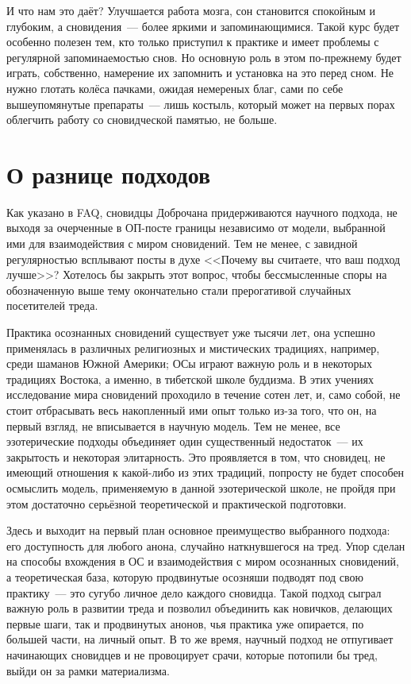 \documentclass[a5paper,12pt,twoside]{memoir}
\begin{document}
И что нам это даёт? Улучшается работа мозга, сон становится спокойным и глубоким, а сновидения~--- более яркими и запоминающимися. Такой курс будет особенно полезен тем, кто только приступил к практике и имеет проблемы с регулярной запоминаемостью снов. Но основную роль в этом по-прежнему будет играть, собственно, намерение их запомнить и установка на это перед сном. Не нужно глотать колёса пачками, ожидая немереных благ, сами по себе вышеупомянутые препараты~--- лишь костыль, который может на первых порах облегчить работу со сновидческой памятью, не больше.



\chapter{О разнице подходов}

Как указано в FAQ, сновидцы Доброчана придерживаются научного подхода, не выходя за очерченные в ОП-посте границы независимо от модели, выбранной ими для взаимодействия с миром сновидений. Тем не менее, с завидной регулярностью всплывают посты в духе <<Почему вы считаете, что ваш подход лучше>>? Хотелось бы закрыть этот вопрос, чтобы бессмысленные споры на обозначенную выше тему окончательно стали прерогативой случайных посетителей треда.

Практика осознанных сновидений существует уже тысячи лет, она успешно применялась в различных религиозных и мистических традициях, например, среди шаманов Южной Америки; ОСы играют важную роль и в некоторых традициях Востока, а именно, в тибетской школе буддизма. В этих учениях исследование мира сновидений проходило в течение сотен лет, и, само собой, не стоит отбрасывать весь накопленный ими опыт только из-за того, что он, на первый взгляд, не вписывается в научную модель. Тем не менее, все эзотерические подходы объединяет один существенный недостаток~--- их закрытость и некоторая элитарность. Это проявляется в том, что сновидец, не имеющий отношения к какой-либо из этих традиций, попросту не будет способен осмыслить модель, применяемую в данной эзотерической школе, не пройдя при этом достаточно серьёзной теоретической и практической подготовки.

Здесь и выходит на первый план основное преимущество выбранного подхода: его доступность для любого анона, случайно наткнувшегося на тред. Упор сделан на способы вхождения в ОС и взаимодействия с миром осознанных сновидений, а теоретическая база, которую продвинутые осозняши подводят под свою практику~--- это сугубо личное дело каждого сновидца. Такой подход сыграл важную роль в развитии треда и позволил объединить как новичков, делающих первые шаги, так и продвинутых анонов, чья практика уже опирается, по большей части, на личный опыт. В то же время, научный подход не отпугивает начинающих сновидцев и не провоцирует срачи, которые потопили бы тред, выйди он за рамки материализма.
\end{document}
